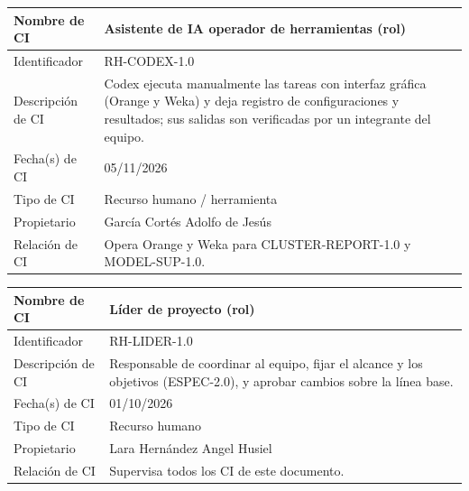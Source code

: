 \documentclass[letterpaper,11pt]{article}
\begin{document}
\noindent\begin{minipage}{\textwidth}
\small\renewcommand{\arraystretch}{1.9}
\begin{tabularx}{\textwidth}{|p{3.3cm}|Y|}
\hline
Nombre de CI & Asistente de IA operador de herramientas (rol) \\ \hline
Identificador & RH-CODEX-1.0 \\ \hline
Descripción de CI & Codex ejecuta manualmente las tareas con interfaz gráfica (Orange y Weka) y deja registro de configuraciones y resultados; sus salidas son verificadas por un integrante del equipo. \\ \hline
Fecha(s) de CI & 05/11/2026 \\ \hline
Tipo de CI & Recurso humano / herramienta \\ \hline
Propietario & García Cortés Adolfo de Jesús \\ \hline
Relación de CI & Opera Orange y Weka para CLUSTER-REPORT-1.0 y MODEL-SUP-1.0. \\ \hline
\end{tabularx}
\end{minipage}\par\bigskip
\noindent\begin{minipage}{\textwidth}
\small\renewcommand{\arraystretch}{1.9}
\begin{tabularx}{\textwidth}{|p{3.3cm}|Y|}
\hline
Nombre de CI & Líder de proyecto (rol) \\ \hline
Identificador & RH-LIDER-1.0 \\ \hline
Descripción de CI & Responsable de coordinar al equipo, fijar el alcance y los objetivos (ESPEC-2.0), y aprobar cambios sobre la línea base. \\ \hline
Fecha(s) de CI & 01/10/2026 \\ \hline
Tipo de CI & Recurso humano \\ \hline
Propietario & Lara Hernández Angel Husiel \\ \hline
Relación de CI & Supervisa todos los CI de este documento. \\ \hline
\end{tabularx}
\end{minipage}\par\bigskip
\end{document}
